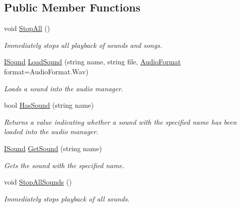 \subsection*{Public Member Functions}
\begin{DoxyCompactItemize}
\item 
void \hyperlink{interface_tri_devs_1_1_tri_engine2_d_1_1_audio_1_1_i_audio_manager_abbbb19396ba31eab12c4f2911c334dd8}{Stop\-All} ()
\begin{DoxyCompactList}\small\item\em Immediately stops all playback of sounds and songs. \end{DoxyCompactList}\item 
\hyperlink{interface_tri_devs_1_1_tri_engine2_d_1_1_audio_1_1_i_sound}{I\-Sound} \hyperlink{interface_tri_devs_1_1_tri_engine2_d_1_1_audio_1_1_i_audio_manager_ab0467ab9a5bb98e1e219c1208d452b82}{Load\-Sound} (string name, string file, \hyperlink{namespace_tri_devs_1_1_tri_engine2_d_1_1_audio_ae238794863562d9b6204219dd29019ff}{Audio\-Format} format=Audio\-Format.\-Wav)
\begin{DoxyCompactList}\small\item\em Loads a sound into the audio manager. \end{DoxyCompactList}\item 
bool \hyperlink{interface_tri_devs_1_1_tri_engine2_d_1_1_audio_1_1_i_audio_manager_aa740fdb04cf5021282440e973e6eb1fb}{Has\-Sound} (string name)
\begin{DoxyCompactList}\small\item\em Returns a value indicating whether a sound with the specified name has been loaded into the audio manager. \end{DoxyCompactList}\item 
\hyperlink{interface_tri_devs_1_1_tri_engine2_d_1_1_audio_1_1_i_sound}{I\-Sound} \hyperlink{interface_tri_devs_1_1_tri_engine2_d_1_1_audio_1_1_i_audio_manager_a2f0e71d3f95bb907556fdc77697086c4}{Get\-Sound} (string name)
\begin{DoxyCompactList}\small\item\em Gets the sound with the specified name. \end{DoxyCompactList}\item 
void \hyperlink{interface_tri_devs_1_1_tri_engine2_d_1_1_audio_1_1_i_audio_manager_a8a2382837eaadbd1fbc2c12eb7e563db}{Stop\-All\-Sounds} ()
\begin{DoxyCompactList}\small\item\em Immediately stops playback of all sounds. \end{DoxyCompactList}\item 

\end{DoxyCompactItemize}
